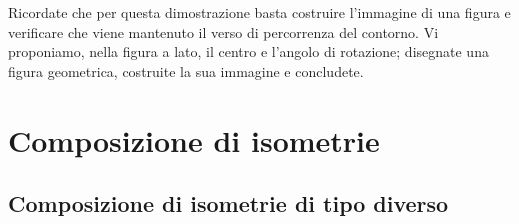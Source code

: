 Ricordate che per questa dimostrazione basta costruire l'immagine di una figura e verificare che viene mantenuto il verso di percorrenza del contorno. Vi proponiamo, nella figura a lato, il centro e l'angolo di rotazione; disegnate una figura geometrica, costruite la sua immagine e concludete.

\begin{comment}		
69   Costruite l’immagine del quadrato ABCD nella rotazione di +90° avente come centro di simmetria il vertice B.
Fissate i punti medi M ed N rispettivamente di AB e di CD; dove si trovano le rispettive immagini?
70   È vero  che il quadrato è unito nella rotazione avente come centro il punto d’incontro delle diagonali e come ampiezza 90°?
71   “L’ortocentro di un triangolo equilatero è il centro di una rotazione in cui il triangolo è unito”. Determinate l’angolo di rotazione.
72   Costruite l’immagine A’B’C’ del triangolo equilatero ABC nella rotazione di centro B e ampiezza . Dimostrate che C, B, A’ sono allineati e che ABC’ è un triangolo equilatero congruente a quello dato.
\end{comment}
		
\section{Composizione di isometrie}
		
\subsection{Composizione di isometrie di tipo diverso}
		
